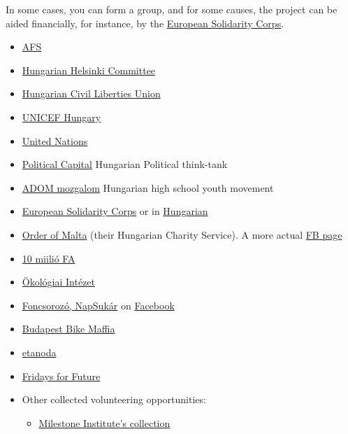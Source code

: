 \documentclass{article}
\begin{document}
In some cases, you can form a group, and for some causes, the project can be aided financially, for instance, by the \href{https://youth.europa.eu/solidarity/mission_en}{European Solidarity Corps}.
\begin{itemize}
    \item \href{https://afs.org/}{AFS}
    \item \href{https://helsinki.hu/en/support/apply-to-volunteer/}{Hungarian Helsinki Committee}
    \item \href{https://hclu.hu/en/about-us}{Hungarian Civil Liberties Union}
    \item \href{https://unicef.hu/igy-segithetsz/onkentes}{UNICEF Hungary}
    \item \href{https://www.unv.org/}{United Nations}
    \item \href{https://www.politicalcapital.hu/}{Political Capital} Hungarian Political think-tank
    \item \href{https://adommozgalom.hu/}{ADOM mozgalom} Hungarian high school youth movement
    \item \href{https://europa.eu/youth/solidarity_en}{European Solidarity Corps} or in \href{http://eplusifjusag.hu/hu/esc}{Hungarian}
    \item \href{https://maltai.hu/onkentesseg}{Order of Malta} (their Hungarian Charity Service). A more actual \href{https://www.facebook.com/maltai.szeretetszolgalat/}{FB page}
    \item \href{https://10milliofa.hu/}{10 miilió FA}
    \item \href{https://www.ecolinst.hu/index.php}{Ökológiai Intézet}
    \item \href{https://web.archive.org/web/20171124170411/http://foncsorozo.hu/napsukar/}{Foncsorozó, NapSukár} on \href{https://www.facebook.com/napsukar/}{Facebook}
    \item \href{https://bikemaffia.com/}{Budapest Bike Maffia}
    \item \href{http://www.etanoda.hu/segits_oktatassal_gyere_hozzank_mentornak_207}{etanoda}
    \item \href{https://fridaysforfuture.org/}{Fridays for Future}
    \item Other collected volunteering opportunities:
    \begin{itemize}
        \item \href{https://web.archive.org/web/20201127231820/https://milestone-institute.org/volunteering/}{Milestone Institute’s collection} 
    \end{itemize}
\end{itemize}
\end{document}
